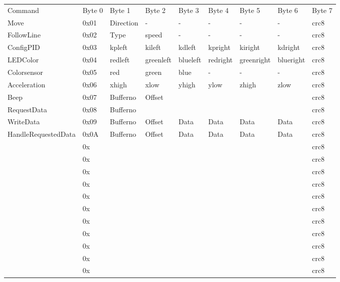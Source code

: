 \documentclass[a4paper]{article}
\begin{document}
\begin{landscape}
\begin{tabular}{lllllllll}
Command &
    Byte 0 &
    Byte 1 &
    Byte 2 &
    Byte 3 &
    Byte 4 &
    Byte 5 &
    Byte 6 &
    Byte 7 \\
Move &
    0x01 &
    Direction &
    - &
    - &
    - &
    - &
    - &
    crc8 \\
FollowLine &
    0x02 &
    Type &
    speed &
    - &
    - &
    - &
    - &
    crc8 \\
ConfigPID &
    0x03 &
    kpleft &
    kileft &
    kdleft &
    kpright &
    kiright &
    kdright &
    crc8 \\
LEDColor &
    0x04 &
    redleft &
    greenleft &
    blueleft &
    redright &
    greenright &
    blueright &
    crc8 \\
Colorsensor &
    0x05 &
    red &
    green &
    blue &
    - &
    - &
    - &
    crc8 \\
Acceleration &
    0x06 &
    xhigh &
    xlow &
    yhigh &
    ylow &
    zhigh &
    zlow &
    crc8 \\
Beep &
    0x07 &
    Bufferno &
    Offset &
     &
     &
     &
     &
    crc8 \\
RequestData &
    0x08 &
    Bufferno &
     &
     &
     &
     &
     &
    crc8 \\
WriteData &
    0x09 &
    Bufferno &
    Offset &
    Data &
    Data &
    Data &
    Data &
    crc8 \\
HandleRequestedData &
    0x0A &
    Bufferno &
    Offset &
    Data &
    Data &
    Data &
    Data &
    crc8 \\
 &
    0x &
     &
     &
     &
     &
     &
     &
    crc8 \\
 &
    0x &
     &
     &
     &
     &
     &
     &
    crc8 \\
 &
    0x &
     &
     &
     &
     &
     &
     &
    crc8 \\
 &
    0x &
     &
     &
     &
     &
     &
     &
    crc8 \\
 &
    0x &
     &
     &
     &
     &
     &
     &
    crc8 \\
 &
    0x &
     &
     &
     &
     &
     &
     &
    crc8 \\
 &
    0x &
     &
     &
     &
     &
     &
     &
    crc8 \\
 &
    0x &
     &
     &
     &
     &
     &
     &
    crc8 \\
 &
    0x &
     &
     &
     &
     &
     &
     &
    crc8 \\
 &
    0x &
     &
     &
     &
     &
     &
     &
    crc8 \\
 &
    0x &
     &
     &
     &
     &
     &
     &
    crc8 \\

\end{tabular}
\end{landscape}
\end{document}

